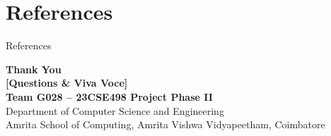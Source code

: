 \documentclass[aspectratio=169, 11pt]{beamer}
\begin{document}
\section{References}
\nocite{*}
\begin{frame}[allowframebreaks]{References}
    \scriptsize
    
    
\end{frame}

\begin{frame}
    \centering
    \vspace{0.8cm}
    {\Huge \textbf{\textcolor{amritaMaroon}{Thank You}}} \\[0.5cm]
    {\large \textbf{[Questions \& Viva Voce]}} \\[0.8cm]
    {\footnotesize \textbf{Team G028 -- 23CSE498 Project Phase II}} \\
    {\scriptsize Department of Computer Science and Engineering} \\
    {\scriptsize Amrita School of Computing, Amrita Vishwa Vidyapeetham, Coimbatore}
\end{frame}
\end{document}
